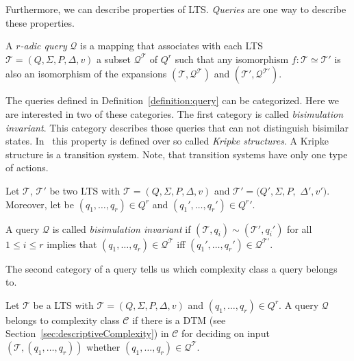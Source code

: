Furthermore, we can describe properties of LTS. \textit{Queries} are one way to describe these properties.

\begin{definition}{\cite{otto1999bisimulation}}
    \label{definition:query}
    A \emph{$r$-adic query} $\mathcal{Q}$ is a mapping that associates with each LTS $\mathcal{T} = (Q, \Sigma, P,
    \Delta, v)$ a subset $\mathcal{Q}^{\mathcal{T}}$ of $Q^r$ such that any isomorphism $f:
    \mathcal{T} \simeq \mathcal{T}'$ is also an isomorphism of the expansions $(\mathcal{T}, \mathcal{Q}^{\mathcal{T}})$
    and $({\mathcal{T}}', \mathcal{Q}^{{\mathcal{T}}'})$.
\end{definition}

The queries defined in Definition~\ref{definition:query} can be categorized. Here we are interested in two of these
categories. The first category is called \textit{bisimulation invariant}. This category describes those queries that
can not distinguish bisimilar states. In~\cite{otto1999bisimulation} this property is defined over so called
\textit{Kripke structures}. A Kripke structure is a transition system. Note, that transition systems have only one
type of actions.

\begin{definition}
    \label{definition:bisimulationInvariant}
    Let $\mathcal{T}$, $\mathcal{T}'$ be two LTS with $\mathcal{T} = (Q, \Sigma, P, \Delta, v)$
    and $\mathcal{T}' = (Q', \Sigma, P,$ $ \Delta', v')$. Moreover, let be $(q_1, \dots, q_r) \in Q^r$ and $({q_1}',
    \dots, {q_r}') \in {Q^r}'$.

    A query $\mathcal{Q}$ is called \emph{bisimulation invariant} if $(\mathcal{T}, q_i) \sim (\mathcal{T}', q_i')$
    for all $1 \leq i \leq r$ implies that $(q_1, \dots, q_r) \in \mathcal{Q}^\mathcal{T}$ iff $({q_1}',
    \dots, {q_r}') \in \mathcal{Q}^{{\mathcal{T}}'}$.
\end{definition}

The second category of a query tells us which complexity class a query belongs to.

\begin{definition}
    \label{definition:queryBelongsToComplexityClass}
    Let $\mathcal{T}$ be a LTS with $\mathcal{T} = (Q, \Sigma, P, \Delta, v)$ and $(q_1, \dots, q_{r}) \in Q^r$.
    A query $\mathcal{Q}$ belongs to complexity class $\mathcal{C}$ if there is a DTM (see
    Section~\ref{sec:descriptiveComplexity}) in $\mathcal{C}$ for deciding on input $(\mathcal{T}, (q_1, \dots,
    q_{r}))$ whether $(q_1, \dots, q_{r}) \in \mathcal{Q}^\mathcal{T}$.
\end{definition}

